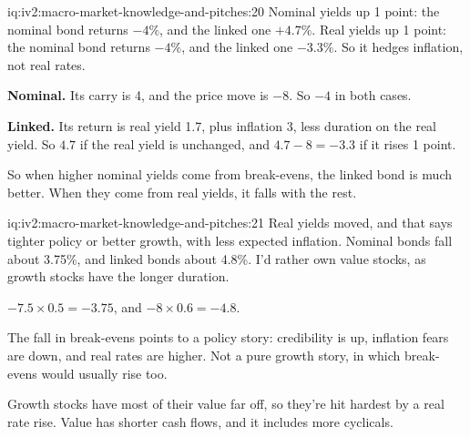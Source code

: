 \begin{solution}{iq:iv2:macro-market-knowledge-and-pitches:20}
Nominal yields up 1 point: the nominal bond returns $-4\%$, and the linked one $+4.7\%$. Real yields up 1 point: the nominal bond returns $-4\%$, and the linked one $-3.3\%$. So it hedges inflation, not real rates.

\textbf{Nominal.} Its carry is 4, and the price move is $-8$. So $-4$ in both cases.

\textbf{Linked.} Its return is real yield 1.7, plus inflation 3, less duration on the real yield. So $4.7$ if the real yield is unchanged, and $4.7 - 8 = -3.3$ if it rises 1 point.

So when higher nominal yields come from break-evens, the linked bond is much better. When they come from real yields, it falls with the rest.

\end{solution}

\begin{solution}{iq:iv2:macro-market-knowledge-and-pitches:21}
Real yields moved, and that says tighter policy or better growth, with less expected inflation. Nominal bonds fall about 3.75\%, and linked bonds about 4.8\%. I'd rather own value stocks, as growth stocks have the longer duration.

$-7.5 \times 0.5 = -3.75$, and $-8 \times 0.6 = -4.8$.

The fall in break-evens points to a policy story: credibility is up, inflation fears are down, and real rates are higher. Not a pure growth story, in which break-evens would usually rise too.

Growth stocks have most of their value far off, so they're hit hardest by a real rate rise. Value has shorter cash flows, and it includes more cyclicals.

\end{solution}

